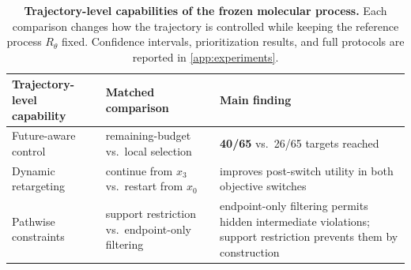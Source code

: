 \begin{table}[!ht]
\centering\small\setlength{\tabcolsep}{5pt}
\begin{tabular}{@{}p{} p{} p{}@{}}
\toprule
Trajectory-level capability & Matched comparison & Main finding \\
\midrule
Future-aware control & remaining-budget vs.\ local selection
  & \textbf{40/65} vs.\ 26/65 targets reached \\
Dynamic retargeting & continue from $x_3$ vs.\ restart from $x_0$
  & improves post-switch utility in both objective switches \\
Pathwise constraints & support restriction vs.\ endpoint-only filtering
  & endpoint-only filtering permits hidden intermediate violations; support
    restriction prevents them by construction \\
\bottomrule
\end{tabular}
\caption{\small\textbf{Trajectory-level capabilities of the frozen molecular
process.} Each comparison changes how the trajectory is controlled while keeping
the reference process $R_\theta$ fixed. Confidence intervals, prioritization
results, and full protocols are reported in \cref{app:experiments}.}
\label{tab:mechanism}%
\label{fig:mechanism}
\end{table}
